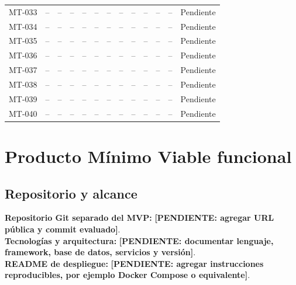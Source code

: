 \documentclass[12pt,journal,onecolumn]{IEEEtran}
\newcommand{\pendiente}[1]{\textcolor{red!70!black}{\textbf{[PENDIENTE: #1]}}}
\begin{document}
\begin{landscape}
\begin{longtable}{P{0.9cm}P{1.0cm}P{0.8cm}P{1.0cm}P{1.1cm}P{1.0cm}P{1.0cm}P{0.7cm}P{0.9cm}P{0.9cm}P{0.9cm}P{1.2cm}P{1.1cm}}
MT-033 & -- & -- & -- & -- & -- & -- & -- & -- & -- & -- & -- & Pendiente\\
MT-034 & -- & -- & -- & -- & -- & -- & -- & -- & -- & -- & -- & Pendiente\\
MT-035 & -- & -- & -- & -- & -- & -- & -- & -- & -- & -- & -- & Pendiente\\
MT-036 & -- & -- & -- & -- & -- & -- & -- & -- & -- & -- & -- & Pendiente\\
MT-037 & -- & -- & -- & -- & -- & -- & -- & -- & -- & -- & -- & Pendiente\\
MT-038 & -- & -- & -- & -- & -- & -- & -- & -- & -- & -- & -- & Pendiente\\
MT-039 & -- & -- & -- & -- & -- & -- & -- & -- & -- & -- & -- & Pendiente\\
MT-040 & -- & -- & -- & -- & -- & -- & -- & -- & -- & -- & -- & Pendiente\\
\bottomrule
\end{longtable}
\normalsize
\end{landscape}

\section{Producto Mínimo Viable funcional}
\subsection{Repositorio y alcance}
\textbf{Repositorio Git separado del MVP:} \pendiente{agregar URL pública y commit evaluado}.\\
\textbf{Tecnologías y arquitectura:} \pendiente{documentar lenguaje, framework, base de datos, servicios y versión}.\\
\textbf{README de despliegue:} \pendiente{agregar instrucciones reproducibles, por ejemplo Docker Compose o equivalente}.
\end{document}
